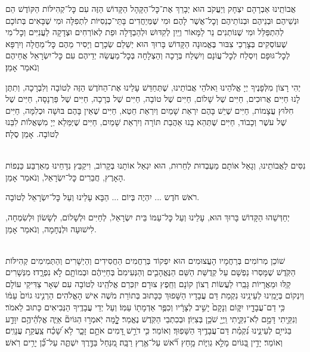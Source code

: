 \documentclass[twoside, openany, parskip=half, 11pt]{book}
\begin{document}
אֲבוֹתֵֽינוּ אַבְרָהָם יִצְחָק וְיַעֲקֹב הוּא יְבָרֵךְ אֶת־כׇּל־הַקָּהָל הַקָּדוֹשׁ הַזֶּה עִם כׇּל־קְהִילּוֹת הַקּוֹדֶשׁ הֵם וּנְשֵׁיהֶם וּבְנֵיהֶם וּבְנוֹתֵיהֶם וְכׇל־אֲשֶׁר לָהֶם׃ וּמִי שֶׁמְּיַחֲדִים בָּתֵּי־כְנֵסִיּוֹת לִתְפִלָּה וּמִי שֶׁבָּאִים בְּתוֹכָם לְהִתְפַּלֵּל וּמִי שֶׁנּוֹתְנִים נֵר לַמָּאוֹר וְיַֽיִן לְקִדּוּשׁ וּלְהַבְדָּלָה וּפַת לְאוֹרְחִים וּצְדָקָה לַעֲנִיִּים וְכׇל־מִי שֶׁעוֹסְקִים בְּצׇרְכֵי צִבּוּר בֶּאֱמוּנָה הַקָּדוֹשׁ בָּרוּךְ הוּא יְשַׁלֵם שְׂכָרָם וְיָסִיר מֵהֶם כׇּל־מַחֲלָה וְיִרְפָּא לְכׇל־גּוּפָם וְיִסְלַח לְכׇל־עֲוֹנָם וְיִשְׁלַח בְּרָכָה וְהַצְלָחָה בְּכׇל־מַעֲשֵׂה יְדֵיהֶם עִם כׇּל־יִשְׂרָאֵל אֲחֵיהֶם וְנֹאמַר אָמֵן׃


יְהִי רָצוֹן מִלְּפָנֶיךָ יְיָ אֱלֹהֵינוּ וֵאלֹהֵי אֲבוֹתֵינוּ,
שֶׁתְּחַדֵּשׁ עָלֵינוּ אֶת־הַחֹדֶשׁ הַזֶּה לְטוֹבָה וְלִבְרָכָה,
וְתִתֶּן לָנוּ חַיִּים אֲרוּכִים,
חַיִּים שֶׁל שָׁלוֹם,
חַיִּים שֶׁל טוֹבָה,
חַיִּים שֶׁל בְּרָכָה,
חַיִּים שֶׁל פַּרְנָסָה,
חַיִּים שֶׁל חִלּוּץ עֲצָמוֹת,
חַיִּים שֶׁיֵשׁ בָּהֶם יִרְאַת שָׁמַיִם וְיִרְאַת חֵטְא,
חַיִּים שֶׁאֵין בָּהֶם בּוּשָׁה וּכְלִמָּה,
חַיִּים שֶׁל עשֶׁר וְכָבוֹד,
חַיִּים שֶׁתְּהֵא בָנוּ אַהֲבַת תּוֹרָה וְיִרְאַת שָׁמַיִם,
חַיִּים שֶׁיְּמַּלֵא יְיָ מִשְׁאֲלוֹת לִבֵּנוּ לְטוֹבָה. אָמֵן סֶלָה׃

\\
נִסִּים לַאֲבוֹתֵינוּ, וְגָאַל אוֹתָם מֵעַבְדוּת לְחֵרוּת, הוּא יִגְאַל אוֹתָנוּ בְּקָרוֹב, וִיקַבֵּץ נִדָּחֵינוּ מֵאַרְבַּע כַּנְפוֹת הָאָרֶץ, חֲבֵרִים כׇּל־יִשְׂרָאֵל, וְנֹאמַר אָמֵן.

רֹאשׁ חֹדֶש ... יִהְיֶה בְּיוֹם ... הַבָּא עָלֵינוּ וְעַל כׇּל־יִשְׂרָאֵל לְטוֹבָה.

יְחַדְּשֵׁהוּ הַקָּדוֹשׁ בָּרוּךְ הוּא, עָלֵינוּ וְעַל כׇּל־עַמּוֹ בֵּית יִשְׂרָאֵל, לְחַיִּים וּלְשָׁלוֹם, לְשָׂשׂוֹן וּלְשִׂמְחָה, לִישׁוּעָה וּלְנֶחָמָה, וְנֹאמַר אָמֵן.

\label{avharachamim}
\\
שׁוֹכֵן מְרוֹמִים בְּרַחֲמָיו הָעֲצוּמִים הוּא יִפְקוֹד בְּרַחֲמִים הַחֲסִידִים וְהַיְשָׁרִים וְהַתְּמִימִים קְהִילּוֹת הַקֹּֽדֶשׁ שֶׁמָּסְרוּ נַפְשָׁם עַל קְדֻשַּׁת הַשֵּׁם הַנֶּאֱהָבִ֤ים וְהַנְּעִימִם֙ בְּחַיֵּיהֶ֔ם וּבְמוֹתָ֖ם לֹ֣א נִפְרָ֑דוּ׃ מִנְּשָׁרִים קַֽלּוּ וּמֵאֲרָיוֹת גָּבֵֽרוּ לַעֲשׂוֹת רְצוֹן קוֹנָם וְחֵֽפֶץ צוּרָם׃ יִזְכְּרֵם אֱלֹהֵֽינוּ לְטוֹבָה עִם שְׁאָר צַדִּיקֵי עוֹלָם וְיִנְקוֹם בְּיָמֵֽינוּ לְעֵינֵֽינוּ נִקְמַת דַּם עֲבָדָיו הַשָּׁפוּךְ כַּכָּתוּב בְּתוֹרַת מֹשֶׁה אִישׁ הָאֱלֹהִים׃ הַרְנִ֤ינוּ גוֹיִם֙ עַמּ֔וֹ כִּ֥י דַם־עֲבָדָ֖יו יִקּ֑וֹם וְנָקָם֙ יָשִׁ֣יב לְצָרָ֔יו וְכִפֶּ֥ר אַדְמָת֖וֹ עַמּֽוֹ׃ וְעַל יְדֵי עֲבָדֶֽיךָ הַנְּבִיאִים כָּתוּב לֵאמֹר׃ וְנִקֵּ֖יתִי דָּמָ֣ם לֹֽא־נִקֵּ֑יתִי וַֽיְיָ֖ שֹׁכֵ֥ן בְּצִיּֽוֹן׃ וּבְכִתְבֵי הַקֹּֽדֶשׁ נֶאֱמַר׃ לׇׇׇ֤מָּה יֹֽאמְר֣וּ הַגּוֹיִם֘ אַיֵּ֢ה אֱלֹֽהֵ֫יהֶ֥ם יִוָּדַ֣ע בַּגֹּייִ֣ם לְעֵינֵ֑ינוּ נִ֝קְמַ֗ת דַּם־עֲבָדֶ֥יךָ הַשָּׁפֽוּךְ׃ וְאוֹמֵר׃ כִּ֤י דֹרֵ֣שׁ דָּ֭מִים אֹתָ֣ם זָכָ֑ר לֹ֥א שָׁ֝כַ֗ח צַֽעֲקַ֥ת עֲנָוִֽים׃ וְאוֹמֵר׃ יָדִ֣ין בַּ֭גּוֹיִם מָלֵ֣א גְוִיּ֑וֹת מָ֥חַץ רֹ֝֗אשׁ עַל־אֶ֥רֶץ רַבָּֽה׃ מִ֭נַּחַל בַּדֶּ֣רֶךְ יִשְׁתֶּ֑ה עַל־כֵּ֝֗ן יָרִ֥ים רֹֽאשׁ׃
\end{document}
